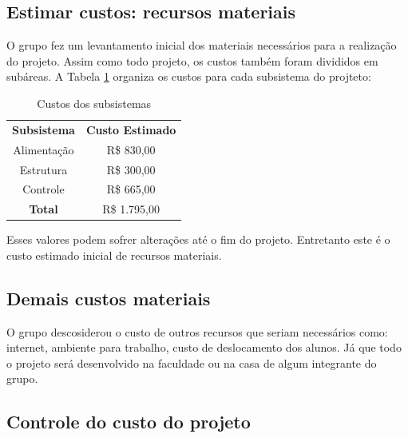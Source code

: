 \subsection{Estimar custos: recursos materiais}
O grupo fez um levantamento inicial dos materiais necessários para a realização do projeto. Assim como todo projeto, os custos também foram divididos em subáreas. A Tabela \ref{tab:custo_sub} organiza os custos para cada subsistema do projteto:


\begin{table}[h]
 \centering
 \caption{Custos dos subsistemas} \label{tab:custo_sub}
 {\renewcommand\arraystretch{1.25}
 \begin{tabular}{ l l }
  \cline{1-1}\cline{2-2}  
    \multicolumn{1}{|c|}{\textbf{Subsistema}} &
    \multicolumn{1}{c|}{\textbf{Custo Estimado}}
  \\  
  \cline{1-1}\cline{2-2}  
    \multicolumn{1}{|c|}{Alimentação} &
    \multicolumn{1}{c|}{R\$ 830,00}
  \\  
  \cline{1-1}\cline{2-2}  
    \multicolumn{1}{|c|}{Estrutura} &
    \multicolumn{1}{c|}{R\$ 300,00}
  \\  
  \cline{1-1}\cline{2-2}  
    \multicolumn{1}{|c|}{Controle} &
    \multicolumn{1}{c|}{R\$ 665,00}
  \\  
  \cline{1-1}\cline{2-2}  
    \multicolumn{1}{|c|}{\textbf{Total}} &
    \multicolumn{1}{c|}{R\$ 1.795,00}
  \\  
  \hline

 \end{tabular} }
\end{table}

Esses valores podem sofrer alterações até o fim do projeto. Entretanto este é o custo estimado inicial de recursos materiais.

\subsection{Demais custos materiais}
O grupo descosiderou o custo de outros recursos que seriam necessários como: internet, ambiente para trabalho, custo de deslocamento dos alunos. Já que todo o projeto será desenvolvido na faculdade ou na casa de algum integrante do grupo.

\subsection{Controle do custo do projeto}

